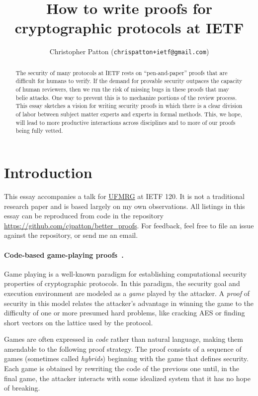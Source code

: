 \documentclass{article}
\title{How to write proofs for cryptographic protocols at IETF}
\author{Christopher Patton ({\texttt{\small chrispatton+ietf@gmail.com}})}
\begin{document}
\maketitle

\begin{abstract}

  The security of many protocols at IETF rests on ``pen-and-paper'' proofs that
  are difficult for humans to verify.
  If the demand for provable security outpaces the capacity of human reviewers,
  then we run the risk of missing bugs in these proofs that may belie attacks.
  One way to prevent this is to mechanize portions of the review process.
  This essay sketches a vision for writing security proofs in which there is a
  clear division of labor between subject matter experts and experts in formal
  methods.
  This, we hope, will lead to more productive interactions across disciplines
  and to more of our proofs being fully vetted.

\end{abstract}

\section{Introduction}\label{ref/intro}

This essay accompanies a talk for
\href{https://datatracker.ietf.org/group/ufmrg/about/}{UFMRG} at IETF 120.
%
It is not a traditional research paper and is based largely on my own
observations.
%
All listings in this essay can be reproduced from code in the repository
\url{https://github.com/cjpatton/better_proofs}.
%
For feedback, feel free to file an issue against the repository, or send me an
email.


\paragraph{Code-based game-playing proofs~\cite{BR06}.}
%
Game playing is a well-known paradigm for establishing computational security
properties of cryptographic protocols.
%
In this paradigm, the security goal and execution environment are modeled as a
\emph{game} played by the attacker. A \emph{proof} of security in this model
relates the attacker's advantage in winning the game to the difficulty of one
or more presumed hard problems, like cracking AES or finding short vectors on
the lattice used by the protocol.

Games are often expressed in \emph{code} rather than natural language, making
them amendable to the following proof strategy.
%
The proof consists of a sequence of games (sometimes called \emph{hybrids})
beginning with the game that defines security.
%
Each game is obtained by rewriting the code of the previous one until, in the
final game, the attacker interacts with some idealized system that it has no
hope of breaking.
\end{document}
